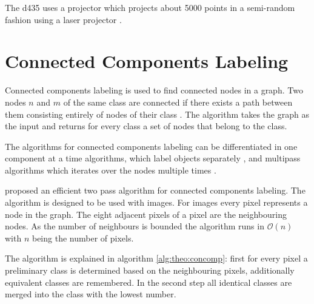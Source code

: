 The \ac{d435} uses a projector which projects about 5000 points in a semi-random fashion using a laser projector \cite{d435Structured}.


\section{Connected Components Labeling} \label{sec:theo:concomp} 
Connected components labeling is used to find connected nodes in a graph.
Two nodes $n$ and $m$ of the same class are connected if there exists a path between them consisting entirely of nodes of their class \cite{digitalImageProcessing}.
The algorithm takes the graph as the input and returns for every class a set of nodes that belong to the class.

The algorithms for connected components labeling can be differentiated in one component at a time algorithms, which label objects separately \cite{abubaker2007}, and multipass algorithms which iterates over the nodes multiple times \cite{HeChaoSuzuki08}.

\cite{HeChaoSuzuki08} proposed an efficient two pass algorithm for connected components labeling.
The algorithm is designed to be used with images.
For images every pixel represents a node in the graph. 
The eight adjacent pixels of a pixel are the neighbouring nodes.
As the number of neighbours is bounded the algorithm runs in $\mathcal{O}(n)$ with $n$ being the number of pixels. 

The algorithm is explained in algorithm \ref{alg:theo:concomp}: first for every pixel a preliminary class is determined based on the neighbouring pixels, additionally equivalent classes are remembered. 
In the second step all identical classes are merged into the class with the lowest number.

